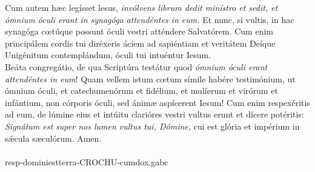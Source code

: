 \documentclass[options]{article}
\begin{document}
	Cum autem hæc legísset lesus, \emph{invólvens librum dedit minístro et sedit, et ómnium óculi erant in synagóga attendéntes in eum.} Et nunc, si vultis, in hac synagóga cœtúque possunt óculi vestri atténdere Salvatórem. Cum enim principálem cordis tui diréxeris áciem ad sapiéntiam et veritátem Deíque Unigénitum contemplándum, óculi tui intuéntur Iesum.\\
	Beáta congregátio, de qua Scriptúra testátur quod \emph{ómnium óculi erant attendéntes in eum}! Quam vellem istum cœtum símile habére testimónium, ut ómnium óculi, et catechumenórum et fidélium, et mulíerum et virórum et infántium, non córporis óculi, sed ánimæ aspícerent Iesum! Cum enim respexéritis ad eum, de lúmine eius et intúitu clarióres vestri vultus erunt et dícere potéritis: \emph{Signátum est super nos lumen vultus tui, Dómine,} cui est glória et impérium in s\'{æ}cula sæculórum. Amen.\\
	\\
	resp-dominiestterra-CROCHU-cumdox.gabc
\end{document}
